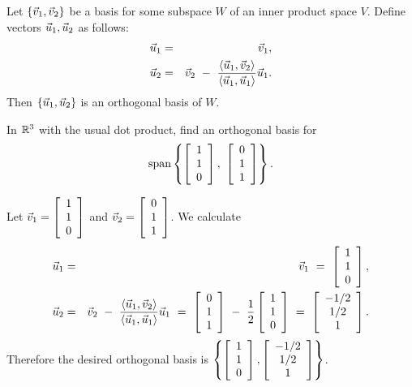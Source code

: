 \documentclass{ximera}
\begin{document}
\begin{proposition}\label{prop:gram-schmidt-2}
  Let $\set{\vect{v}_1,\vect{v}_2}$ be a basis for some subspace $W$
  of an inner product space $V$. Define vectors
  $\vect{u}_1,\vect{u}_2$ as follows:
  \begin{eqnarray*}
    \vect{u}_1 &=& \vect{v}_1, \\
    \vect{u}_2 &=& \vect{v}_2 ~-~ \frac{\iprod{\vect{u}_1,\vect{v}_2}}{\iprod{\vect{u}_1,\vect{u}_1}}\vect{u}_1.
  \end{eqnarray*}
  Then $\set{\vect{u}_1,\vect{u}_2}$ is an orthogonal basis of $W$.
\end{proposition}

\begin{example}\label{ex:gram-schmidt-2}
  In $\R^3$ with the usual dot product, find an orthogonal basis for
  \begin{equation*}
    \sspan\set{
      \startmat{c} 1 \\ 1 \\ 0 \stopmat,~
      \startmat{c} 0 \\ 1 \\ 1 \stopmat
    }.
  \end{equation*}
\end{example}

\begin{solution}
  Let $\vect{v}_1 = \startmat{c} 1 \\ 1 \\ 0 \stopmat$
  and $\vect{v}_2 = \startmat{c} 0 \\ 1 \\ 1 \stopmat$.
  We calculate
  \begin{eqnarray*}
    \vect{u}_1
    &=& \vect{v}_1
        ~=~ \startmat{c} 1 \\ 1 \\ 0 \stopmat, \\
    \vect{u}_2
    &=& \vect{v}_2 ~-~ \frac{\iprod{\vect{u}_1,\vect{v}_2}}{\iprod{\vect{u}_1,\vect{u}_1}}\vect{u}_1
        ~=~ \startmat{c} 0 \\ 1 \\ 1 \stopmat
    ~-~ \frac{1}{2}\startmat{c} 1 \\ 1 \\ 0 \stopmat
    ~=~ \startmat{c} -1/2 \\ 1/2 \\ 1 \stopmat.
  \end{eqnarray*}
  Therefore the desired orthogonal basis is
  $\set{\startmat{c} 1 \\ 1 \\ 0 \stopmat,
    \startmat{c} -1/2 \\ 1/2 \\ 1 \stopmat}$.
\end{solution}
\end{document}
